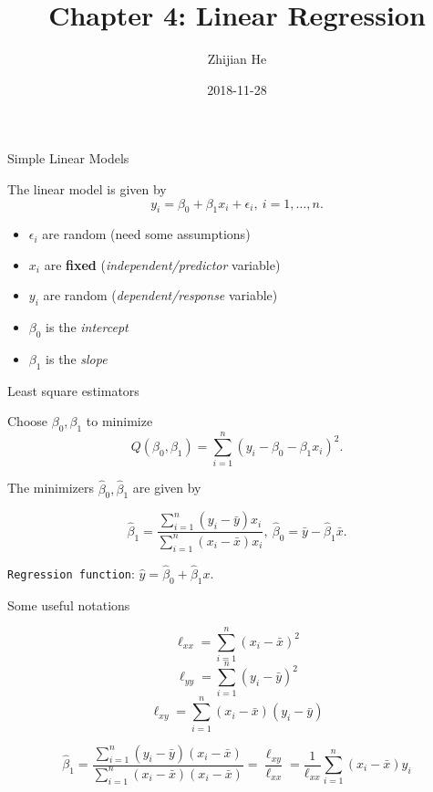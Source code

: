 \documentclass[ignorenonframetext,]{beamer}
\title{Chapter 4: Linear Regression}
\author{Zhijian He}
\date{2018-11-28}
\providecommand{\tightlist}{%
  \setlength{\itemsep}{0pt}\setlength{\parskip}{0pt}}
\begin{document}
\frame{\titlepage}

\begin{frame}{Simple Linear Models}
\protect\hypertarget{simple-linear-models}{}

The linear model is given by
\[y_i=\beta_0+\beta_1x_i+\epsilon_i,\ i=1,\dots,n.\]

\begin{itemize}
\tightlist
\item
  \(\epsilon_i\) are random (need some assumptions)
\item
  \(x_i\) are \textbf{fixed} (\emph{independent/predictor} variable)
\item
  \(y_i\) are random (\emph{dependent/response} variable)
\item
  \(\beta_0\) is the \emph{intercept}
\item
  \(\beta_1\) is the \emph{slope}
\end{itemize}

\end{frame}

\begin{frame}[fragile]{Least square estimators}
\protect\hypertarget{least-square-estimators}{}

Choose \(\beta_0,\beta_1\) to minimize
\[Q(\beta_0,\beta_1) = \sum_{i=1}^n(y_i-\beta_0-\beta_1x_i)^2.\]

The minimizers \(\hat\beta_0,\hat\beta_1\) are given by

\[\hat\beta_1 = \frac{\sum_{i=1}^n(y_i-\bar y)x_i}{\sum_{i=1}^n(x_i-\bar x)x_i},\ \hat\beta_0=\bar y-\hat\beta_1\bar x.\]

\texttt{Regression\ function}: \(\hat y=\hat\beta_0+\hat\beta_1x\).

\end{frame}

\begin{frame}{Some useful notations}
\protect\hypertarget{some-useful-notations}{}

\[\ell_{xx} = \sum_{i=1}^n(x_i-\bar x)^2\]
\[\ell_{yy} = \sum_{i=1}^n(y_i-\bar y)^2\]
\[\ell_{xy} = \sum_{i=1}^n(x_i-\bar x)(y_i-\bar y)\]

\[\hat\beta_1 = \frac{\sum_{i=1}^n(y_i-\bar y)(x_i-\bar x)}{\sum_{i=1}^n(x_i-\bar x)(x_i-\bar x)}=\frac{\ell_{xy}}{\ell_{xx}}=\frac{1}{\ell_{xx}}\sum_{i=1}^n(x_i-\bar x)y_i\]

\end{frame}
\end{document}
